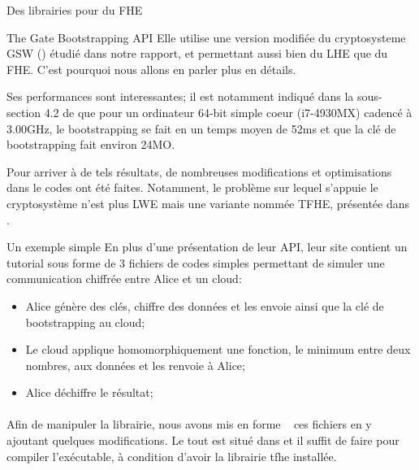 \begin{section}{Des librairies pour du FHE}
\begin{subsection}{The Gate Bootstrapping API}
Elle utilise une version modifiée du cryptosysteme GSW (\cite{C:GenSahWat13})
étudié dans notre rapport, et permettant aussi bien du LHE que du FHE. C'est
pourquoi nous allons en parler plus en détails.

Ses performances sont interessantes; il est notamment indiqué dans la sous-section
4.2 de \cite{cryptoeprint:2016:870} que pour un ordinateur 64-bit simple coeur 
(i7-4930MX) cadencé à 3.00GHz, le bootstrapping se fait en un temps moyen de 52ms et 
que la clé de bootstrapping fait environ 24MO.

Pour arriver à de tels résultats, de nombreuses modifications et optimisations dans le codes ont été faites. Notamment,
le problème sur lequel s'appuie le cryptosystème n'est plus LWE mais une variante nommée TFHE, présentée dans
\cite{cryptoeprint:2016:870}. 

\begin{subsubsection}{Un exemple simple}
En plus d'une présentation de leur API, leur site contient un tutorial sous forme de 3 fichiers de codes simples
permettant de simuler une communication chiffrée entre Alice et un cloud:
\begin{itemize}
\item Alice génère des clés, chiffre des données et les envoie ainsi que la clé de bootstrapping au cloud;
\item Le cloud applique homomorphiquement une fonction, le minimum entre deux nombres, aux données et les renvoie à
Alice;
\item Alice déchiffre le résultat;
\end{itemize}

\paragraph{}
Afin de manipuler la librairie, nous avons \og mis en forme \fg~ ces fichiers
en y ajoutant quelques modifications. Le tout est situé dans 
 et il suffit de faire  
pour compiler l'exécutable, à condition d'avoir la librairie tfhe installée.
	

\end{subsubsection}
\end{subsection}
\end{section}
